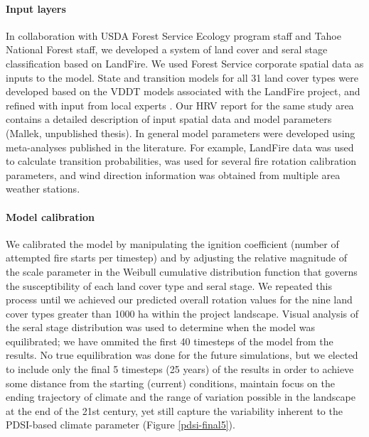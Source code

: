 \documentclass[12pt]{article}
\begin{document}
\begin{spacing}{1}
\paragraph{Input layers}
In collaboration with USDA Forest Service Ecology program staff and Tahoe National Forest staff, we developed a system of land cover and seral stage classification based on LandFire. We used Forest Service corporate spatial data as inputs to the model. State and transition models for all 31 land cover types were developed based on the VDDT models associated with the LandFire project, and refined with input from local experts . Our HRV report for the same study area contains a detailed description of input spatial data and model parameters (Mallek, unpublished thesis). In general model parameters were developed using meta-analyses published in the literature. For example, LandFire data was used to calculate transition probabilities, \citet{Mallek2013} was used for several fire rotation calibration parameters, and wind direction information was obtained from multiple area weather stations.

\paragraph{Model calibration}
We calibrated the model by manipulating the ignition coefficient (number of attempted fire starts per timestep) and by adjusting the relative magnitude of the scale parameter in the Weibull cumulative distribution function that governs the susceptibility of each land cover type and seral stage. We repeated this process until we achieved our predicted overall rotation values for the nine land cover types greater than 1000 ha within the project landscape. Visual analysis of the seral stage distribution was used to determine when the model was equilibrated; we have ommited the first 40 timesteps of the model from the results. No true equilibration was done for the future simulations, but we elected to include only the final 5 timesteps (25 years) of the results in order to achieve some distance from the starting (current) conditions, maintain focus on the ending trajectory of climate and the range of variation possible in the landscape at the end of the 21st century, yet still capture the variability inherent to the PDSI-based climate parameter (Figure \ref{pdsi-final5}).


\end{spacing}
\end{document}

